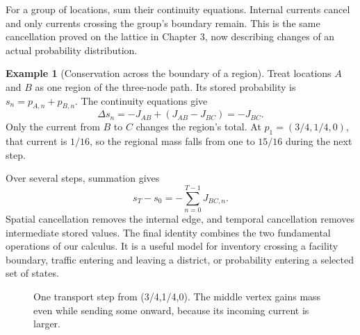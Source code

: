\documentclass[11pt,oneside,openany]{book}
\theoremstyle{definition}
\newtheorem{example}{Example}[chapter]
\theoremstyle{remark}
\numberwithin{equation}{chapter}
\begin{document}
For a group of locations, sum their continuity equations. Internal currents cancel and only currents crossing the group's boundary remain. This is the same cancellation proved on the lattice in Chapter 3, now describing changes of an actual probability distribution.

\begin{example}[Conservation across the boundary of a region]

Treat locations \(A\) and \(B\) as one region of the three-node path. Its stored probability is \(s_n=p_{A,n}+p_{B,n}\). The continuity equations give \[\Delta s_n=-J_{AB}+(J_{AB}-J_{BC})=-J_{BC}.\] Only the current from \(B\) to \(C\) changes the region's total. At \(p_1=(3/4,1/4,0)\), that current is \(1/16\), so the regional mass falls from one to \(15/16\) during the next step.

\end{example}

Over several steps, summation gives \[s_T-s_0=-\sum_{n=0}^{T-1}J_{BC,n}.\] Spatial cancellation removes the internal edge, and temporal cancellation removes intermediate stored values. The final identity combines the two fundamental operations of our calculus. It is a useful model for inventory crossing a facility boundary, traffic entering and leaving a district, or probability entering a selected set of states.

\begin{figure}[htbp]\centering
{}
\caption{One transport step from (3/4,1/4,0). The middle vertex gains mass even while sending some onward, because its incoming current is larger.}\end{figure}
\end{document}
